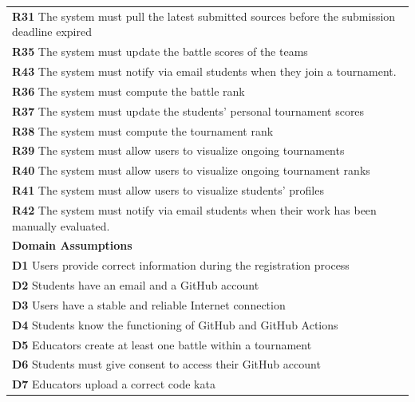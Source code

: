\begin{table}[H]
    \begin{tabularx}{\textwidth}{X}
        \textbf{R31} The system must pull the latest submitted sources before the submission deadline expired     \\  
        \textbf{R35} The system must update the battle scores of the teams       \\ 
        \textbf{R43} The system must notify via email students when they join a tournament. \\
        \textbf{R36} The system must compute the battle rank     \\  
        \textbf{R37} The system must update the students' personal tournament scores         \\ 
        \textbf{R38} The system must compute the tournament rank         \\
        \textbf{R39} The system must allow users to visualize ongoing tournaments    \\
        \textbf{R40} The system must allow users to visualize ongoing tournament ranks       \\
        \textbf{R41} The system must allow users to visualize students' profiles     \\
        \textbf{R42} The system must notify via email students when their work has been manually evaluated. \\
        \midrule
        \textbf{Domain Assumptions}                                                                                                  \\ \midrule
        \textbf{D1} Users provide correct information during the registration process \\
        \textbf{D2} Students have an email and a GitHub account     \\
        \textbf{D3} Users have a stable and reliable Internet connection \\
        \textbf{D4} Students know the functioning of GitHub and GitHub Actions      \\
        \textbf{D5} Educators create at least one battle within a tournament        \\
        \textbf{D6} Students must give consent to access their GitHub account       \\
        \textbf{D7} Educators upload a correct code kata        \\
        \bottomrule
    \end{tabularx}
\end{table}

